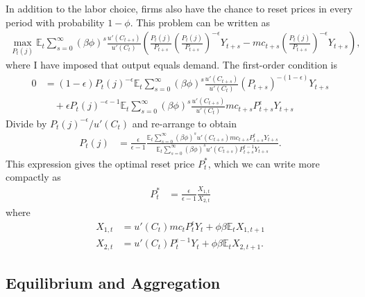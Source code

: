 \documentclass[12 pt, oneside]{article}
\theoremstyle{definition}
\theoremstyle{definition}
\theoremstyle{definition}
\newcommand{\E}{\mathbb{E}}
\begin{document}
In addition to the labor choice, firms also have the chance to reset prices in every period with probability $1 - \phi$. This problem can be
written as
\begin{align*}
  \max_{P_t(j)} \E_t\sum_{s = 0}^\infty(\beta \phi)^s \frac{u'(C_{t + s})}{u'(C_t)}\left(\frac{P_t(j)}{P_{t + s}}\left(\frac{P_t(j)}{P_{t + s}}\right)^{-\epsilon}Y_{t + s} - mc_{t + s}\left(\frac{P_t(j)}{P_{t + s}}\right)^{-\epsilon}Y_{t + s}\right),
\end{align*}
where I have imposed that output equals demand. The first-order condition is
\begin{align*}
0 & =  (1 - \epsilon)P_t(j)^{-\epsilon}\E_t\sum_{s = 0}^\infty (\beta\phi)^s \frac{u'(C_{t + s})}{u'(C_t)}(P_{t + s})^{-(1 - \epsilon)}Y_{t + s}\\
  &\quad + \epsilon P_t(j)^{-\epsilon - 1}\E_t\sum_{s = 0}^\infty (\beta\phi)^s \frac{u'(C_{t + s})}{u'(C_t)} mc_{t + s}P_{t + s}^{\epsilon}Y_{t + s}
\end{align*}
Divide by $P_t(j)^{-\epsilon} / u'(C_t)$ and re-arrange to obtain
\begin{align*}
  P_t(j) & = \frac{\epsilon}{\epsilon - 1}\frac{\E_t\sum_{s = 0}^\infty (\beta\phi)^s u'(C_{t + s}) mc_{t + s}P_{t + s}^{\epsilon}Y_{t + s}}{\E_t\sum_{s = 0}^\infty (\beta\phi)^s u'(C_{t + s})P_{t + s}^{\epsilon - 1}Y_{t + s}}.
\end{align*}
This expression gives the optimal reset price $P_t^*$, which we can write more compactly as
\begin{align*}
  P_t^* & = \frac{\epsilon}{\epsilon - 1}\frac{X_{1, t}}{X_{2, t}}
\end{align*}
where
\begin{align*}
  X_{1, t} & = u'(C_t) mc_t P_t^{\epsilon} Y_t + \phi \beta \E_tX_{1, t + 1}\\
  X_{2, t} & = u'(C_t) P_t^{\epsilon - 1} Y_t + \phi \beta \E_tX_{2, t + 1}.
\end{align*}

\subsection{Equilibrium and Aggregation}
\end{document}
